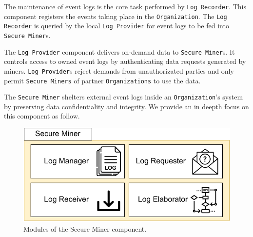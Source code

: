 The maintenance of event logs is the core task performed by \texttt{Log Recorder}. This component registers the events taking place in the \texttt{Organization}. The \texttt{Log Recorder} is queried by the local \texttt{Log Provider} for event logs to be fed into \texttt{Secure Miner}s. 



The \texttt{Log Provider} component delivers on-demand data to \texttt{Secure Miner}s. %
It controls access to owned event logs by authenticating data requests generated by miners. \texttt{Log Provider}s reject demands from unauthorizated parties and only permit \texttt{Secure Miners} of partner \texttt{Organizations} to use the data.    %

The \texttt{Secure Miner} shelters external event logs inside an \texttt{Organization}'s system by preserving data confidentiality and integrity. We provide an in deepth focus on this component as follow.

\begin{figure}[t]
\centering
\includegraphics[width=7 cm]{content/figures/secure_miner.pdf}
\caption{Modules of the Secure Miner component.}
\label{fig:trusted_miner}
\end{figure}




